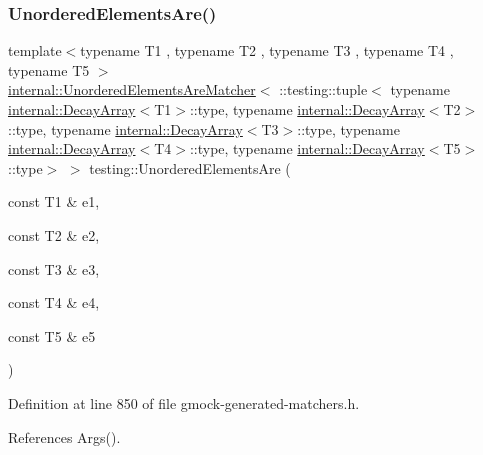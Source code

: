 \subsubsection{\texorpdfstring{Unordered\+Elements\+Are()}{UnorderedElementsAre()}\hspace{0.1cm}{\footnotesize\ttfamily [6/11]}}
{\footnotesize\ttfamily template$<$typename T1 , typename T2 , typename T3 , typename T4 , typename T5 $>$ \\
\hyperlink{classtesting_1_1internal_1_1UnorderedElementsAreMatcher}{internal\+::\+Unordered\+Elements\+Are\+Matcher}$<$ \+::testing\+::tuple$<$ typename \hyperlink{structtesting_1_1internal_1_1DecayArray}{internal\+::\+Decay\+Array}$<$T1$>$\+::type, typename \hyperlink{structtesting_1_1internal_1_1DecayArray}{internal\+::\+Decay\+Array}$<$T2$>$\+::type, typename \hyperlink{structtesting_1_1internal_1_1DecayArray}{internal\+::\+Decay\+Array}$<$T3$>$\+::type, typename \hyperlink{structtesting_1_1internal_1_1DecayArray}{internal\+::\+Decay\+Array}$<$T4$>$\+::type, typename \hyperlink{structtesting_1_1internal_1_1DecayArray}{internal\+::\+Decay\+Array}$<$T5$>$\+::type$>$ $>$ testing\+::\+Unordered\+Elements\+Are (\begin{DoxyParamCaption}\item[{const T1 \&}]{e1,  }\item[{const T2 \&}]{e2,  }\item[{const T3 \&}]{e3,  }\item[{const T4 \&}]{e4,  }\item[{const T5 \&}]{e5 }\end{DoxyParamCaption})\hspace{0.3cm}{\ttfamily [inline]}}



Definition at line 850 of file gmock-\/generated-\/matchers.\+h.



References Args().



